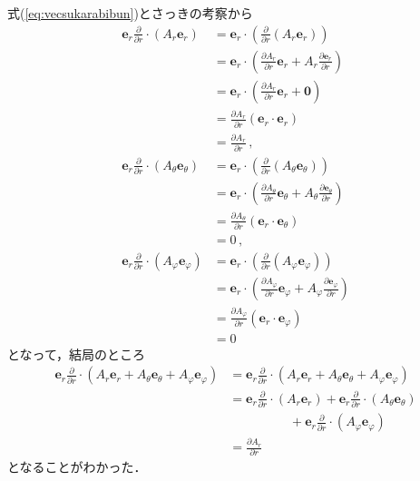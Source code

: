 式(\ref{eq:vecsukarabibun})とさっきの考察から
\begin{align*}
\bm{e}_r \frac{ \partial } {\partial r} \cdot (A_r \bm{e}_r)
& = \bm{e}_r \cdot \left( \frac{ \partial } {\partial r}  (A_r \bm{e}_r) \right) \\
& = \bm{e}_r \cdot \left( \frac{ \partial A_r} {\partial r} \bm{e}_r 
+ A_r \frac{ \partial \bm{e}_r} {\partial r} \right) \\
& = \bm{e}_r \cdot \left( \frac{ \partial A_r} {\partial r} \bm{e}_r + \bm{0} \right) \\
& = \frac{ \partial A_r} {\partial r} ( \bm{e}_r \cdot \bm{e}_r ) \\
& = \frac{ \partial A_r} {\partial r} \, , \\
\bm{e}_r \frac{ \partial } {\partial r} \cdot (A_\theta \bm{e}_\theta) 
& = \bm{e}_r \cdot \left( \frac{ \partial } {\partial r}  (A_\theta \bm{e}_\theta) \right) \\
& = \bm{e}_r \cdot \left( \frac{ \partial A_\theta} {\partial r} \bm{e}_\theta 
+ A_\theta \frac{ \partial \bm{e}_\theta} {\partial r} \right) \\
& = \frac{ \partial A_\theta} {\partial r} ( \bm{e}_r \cdot \bm{e}_\theta) \\
& = 0 \, , \\
\bm{e}_r \frac{ \partial } {\partial r} \cdot (A_\varphi \bm{e}_\varphi) 
& = \bm{e}_r \cdot \left( \frac{ \partial } {\partial r}  (A_\varphi \bm{e}_\varphi) \right) \\
& = \bm{e}_r \cdot \left( \frac{ \partial A_\varphi} {\partial r} \bm{e}_\varphi 
+ A_\varphi \frac{ \partial \bm{e}_\varphi} {\partial r} \right) \\
& = \frac{ \partial A_\varphi} {\partial r} ( \bm{e}_r \cdot \bm{e}_\varphi) \\
& = 0
\end{align*}
となって，結局のところ
\begin{align*}
\bm{e}_r \frac{ \partial } {\partial r} \cdot 
( A_r \bm{e}_r + A_\theta \bm{e}_\theta + A_\varphi \bm{e}_\varphi )
& = \bm{e}_r \frac{ \partial } {\partial r} \cdot 
( A_r \bm{e}_r + A_\theta \bm{e}_\theta + A_\varphi \bm{e}_\varphi ) \\
& = \bm{e}_r \frac{ \partial } {\partial r} \cdot ( A_r \bm{e}_r ) 
+ \bm{e}_r \frac{ \partial } {\partial r} \cdot ( A_\theta \bm{e}_\theta) \\
& \hspace{2cm}
+ \bm{e}_r \frac{ \partial } {\partial r} \cdot ( A_\varphi \bm{e}_\varphi) \\
& = \frac{ \partial A_r} {\partial r} 
\end{align*}
となることがわかった．

